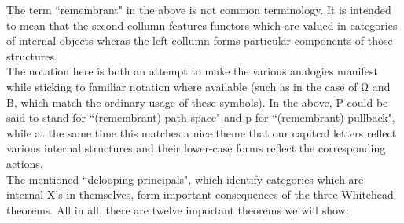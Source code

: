\documentclass{book}
\theoremstyle{definition}
\begin{document}
The term ``remembrant" in the above is not common terminology. It is intended to mean that the second collumn features functors which are valued in categories of internal objects wheras the left collumn forms particular components of those structures.\\

The notation here is both an attempt to make the various analogies manifest while sticking to familiar notation where available (such as in the case of Ω and B, which match the ordinary usage of these symbols). In the above, P could be said to stand for ``(remembrant) path space" and p for ``(remembrant) pullback", while at the same time this matches a nice theme that our capitcal letters reflect various internal structures and their lower-case forms reflect the corresponding actions.\\

The mentioned ``delooping principals", which identify categories which are internal X's in themselves, form important consequences of the three Whitehead theorems. All in all, there are twelve important theorems we will show:\\
\end{document}

